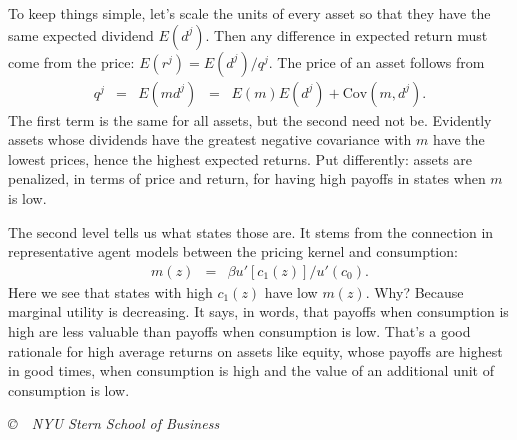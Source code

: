 \documentclass[11pt]{article}
\begin{document}
To keep things simple, let's scale the units of
every asset so that they have the same expected dividend $E(d^j)$.
Then any difference in expected return must come from the price:
$ E(r^j) = E(d^j)/q^j$.
The price of an asset follows from
\begin{eqnarray*}
    q^j &=& E (m d^j)
            \;\;=\;\; E(m) E(d^j) + \mbox{Cov}(m,d^j) .
\end{eqnarray*}
The first term is the same for all assets,
but the second need not be.
Evidently assets whose dividends have the greatest negative covariance
with $m$ have the lowest prices, hence the highest expected returns.
Put differently:  assets are penalized, in terms of price and return,
for having high payoffs in states when $m$ is low.

The second level tells us what states those are.
It stems from the connection
in representative agent models between
the pricing kernel and consumption:
\begin{eqnarray*}
    m(z) &=& \beta u'[c_1(z)]/u'(c_0) .
\end{eqnarray*}
Here we see that states with high $c_1(z)$ have low $m(z)$.
Why?  Because marginal utility is decreasing.
It says, in words, that payoffs when consumption is high
are less valuable than payoffs when consumption is low.
That's a good rationale for high average returns on assets like equity,
whose payoffs are highest in good times,
when consumption is high and the value of an additional
unit of consumption is low.


\vfill \centerline{\it \copyright \ \number\year \
NYU Stern School of Business}
\end{document}
